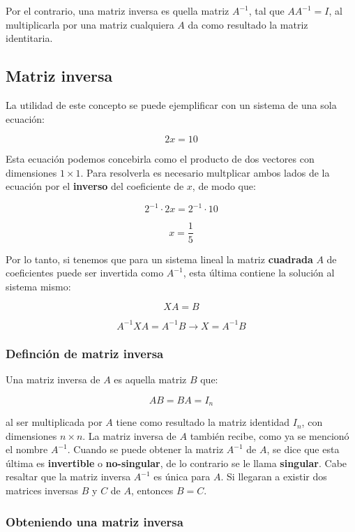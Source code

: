 \documentclass[
]{book}
\begin{document}
Por el contrario, una matriz inversa es quella matriz \(A^{-1}\), tal que \(AA^{-1} = I\), al multiplicarla por una matriz cualquiera \(A\) da como resultado la matriz identitaria.

\hypertarget{matriz-inversa}{%
\subsection{Matriz inversa}\label{matriz-inversa}}

La utilidad de este concepto se puede ejemplificar con un sistema de una sola ecuación:

\[2x = 10\]

Esta ecuación podemos concebirla como el producto de dos vectores con dimensiones \(1 \times 1\). Para resolverla es necesario multplicar ambos lados de la ecuación por el \textbf{inverso} del coeficiente de \(x\), de modo que:

\[2^{-1} \cdot 2x = 2^{-1} \cdot 10\]

\[x = \frac{1}{5}\]

Por lo tanto, si tenemos que para un sistema lineal la matriz \textbf{cuadrada} \(A\) de coeficientes puede ser invertida como \(A^{-1}\), esta última contiene la solución al sistema mismo:

\[XA = B\]

\[A^{-1}XA = A^{-1}B \rightarrow X = A^{-1}B\]

\hypertarget{definciuxf3n-de-matriz-inversa}{%
\subsubsection{Definción de matriz inversa}\label{definciuxf3n-de-matriz-inversa}}

Una matriz inversa de \(A\) es aquella matriz \(B\) que:

\[AB = BA = I_n\]

al ser multiplicada por \(A\) tiene como resultado la matriz identidad \(I_n\), con dimensiones \(n \times n\). La matriz inversa de \(A\) también recibe, como ya se mencionó el nombre \(A^{-1}\). Cuando se puede obtener la matriz \(A^{-1}\) de \(A\), se dice que esta última es \textbf{invertible} o \textbf{no-singular}, de lo contrario se le llama \textbf{singular}. Cabe resaltar que la matriz inversa \(A^{-1}\) es única para \(A\). Si llegaran a existir dos matrices inversas \(B\) y \(C\) de \(A\), entonces \(B=C\).

\hypertarget{obteniendo-una-matriz-inversa}{%
\subsubsection{Obteniendo una matriz inversa}\label{obteniendo-una-matriz-inversa}}
\end{document}
